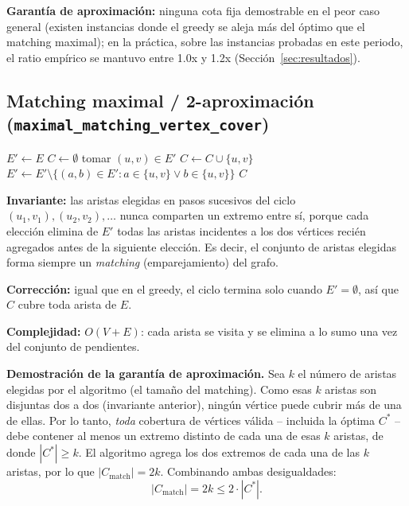 \documentclass[11pt,a4paper]{article}
\begin{document}
\textbf{Garantía de aproximación:} ninguna cota fija demostrable en el peor caso general
(existen instancias donde el greedy se aleja más del óptimo que el matching maximal); en la
práctica, sobre las instancias probadas en este periodo, el ratio empírico se mantuvo entre
1.0x y 1.2x (Sección~\ref{sec:resultados}).

\subsection{Matching maximal / 2-aproximación (\texttt{maximal\_matching\_vertex\_cover})}

\begin{algorithm}[H]
\caption{\texttt{maximal\_matching\_vertex\_cover}}
\begin{algorithmic}[1]
\State $E' \gets E$
\State $C \gets \emptyset$
	\State tomar $(u,v) \in E'$ 
	\State $C \gets C \cup \{u, v\}$
	\State $E' \gets E' \setminus \{(a,b) \in E' : a \in \{u,v\} \lor b \in \{u,v\}\}$
\EndWhile
\State \Return $C$
\end{algorithmic}
\end{algorithm}

\textbf{Invariante:} las aristas elegidas en pasos sucesivos del ciclo
$(u_1,v_1), (u_2,v_2), \dots$ nunca comparten un extremo entre sí, porque cada elección
elimina de $E'$ todas las aristas incidentes a los dos vértices recién agregados antes de
la siguiente elección. Es decir, el conjunto de aristas elegidas forma siempre un
\emph{matching} (emparejamiento) del grafo.

\textbf{Corrección:} igual que en el greedy, el ciclo termina solo cuando $E' = \emptyset$,
así que $C$ cubre toda arista de $E$.

\textbf{Complejidad:} $O(V+E)$: cada arista se visita y se elimina a lo sumo una vez del
conjunto de pendientes.

\textbf{Demostración de la garantía de aproximación.} Sea $k$ el número de aristas elegidas
por el algoritmo (el tamaño del matching). Como esas $k$ aristas son disjuntas dos a dos
(invariante anterior), ningún vértice puede cubrir más de una de ellas. Por lo tanto,
\emph{toda} cobertura de vértices válida -- incluida la óptima $C^{*}$ -- debe contener al
menos un extremo distinto de cada una de esas $k$ aristas, de donde $|C^{*}| \geq k$. El
algoritmo agrega los dos extremos de cada una de las $k$ aristas, por lo que
$|C_{\text{match}}| = 2k$. Combinando ambas desigualdades:
\[
	|C_{\text{match}}| = 2k \leq 2 \cdot |C^{*}|.
\]
\end{document}
